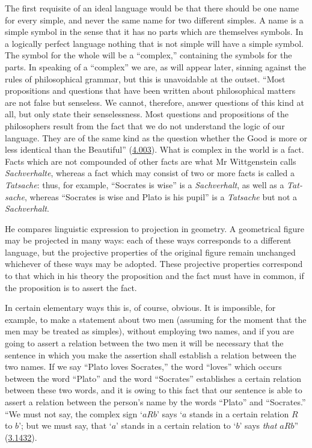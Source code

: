 \documentclass[12pt,oneside]{book}[2007/10/19]
\newcommand{\PropERef}[1]{\hyperref[PropE:#1]{#1}}
\newcommand{\DPtypo}[2]{#2}
\newcommand{\German}[1]{\foreignlanguage{german}{\emph{#1}}}
\begin{document}
The first requisite of an ideal language would be that
there should be one name for every simple, and never the
same name for two different simples. A name is a simple
symbol in the sense that it has no parts which are themselves
symbols. In a logically perfect language nothing
that is not simple will have a simple symbol. The symbol
for the whole will be a ``complex,'' containing the symbols
for the parts. In speaking of a ``complex'' we are, as
will appear later, sinning against the rules of philosophical
grammar, but this is unavoidable at the outset. ``Most
propositions and questions that have been written about
philosophical matters are not false but senseless. We
cannot, therefore, answer questions of this kind at all,
but only state their senselessness. Most questions and
propositions of the \DPtypo{philosopher}{philosophers} result from the fact that
we do not understand the logic of our language. They
are of the same kind as the question whether the Good is
more or less identical than the Beautiful'' (\PropERef{4.003}). What
is complex in the world is a fact. Facts which are not
compounded of other facts are what Mr Wittgenstein calls
\German{Sachverhalte}, whereas a fact which may consist of two
or more facts is called a \German{Tatsache}: thus, for example,
``Socrates is wise'' is a \German{Sachverhalt}, as well as a \German{Tatsache},
whereas ``Socrates is wise and Plato is his pupil'' is a
\German{Tatsache} but not a \German{Sachverhalt}.

He compares linguistic expression to projection in
geometry. A geometrical figure may be projected in
many ways: each of these ways corresponds to a different
language, but the projective properties of the original
figure remain unchanged whichever of these ways may
be adopted. These projective properties correspond to
that which in his theory the proposition and the fact
must have in common, if the proposition is to assert the
fact.

In certain elementary ways this is, of course, obvious.
It is impossible, for example, to make a statement about
two men (assuming for the moment that the men may
be treated as simples), without employing two names, and
if you are going to assert a relation between the two men
it will be necessary that the sentence in which you make
the assertion shall establish a relation between the two
names. If we say ``Plato loves Socrates,'' the word
``loves'' which occurs between the word ``Plato'' and the
word ``Socrates'' establishes a certain relation between
these two words, and it is owing to this fact that our
sentence is able to assert a relation between the person's
name by the words ``Plato'' and ``Socrates.'' ``We must
not say, the complex sign `$a R b$' says `$a$ stands in a
certain relation $R$ to $b$'; but we must say, that `$a$'
stands in a certain relation to `$b$' says \emph{that $a R b$}''
(\PropERef{3.1432}).
\end{document}
